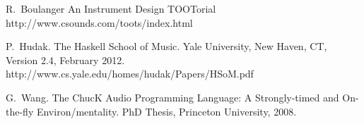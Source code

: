 \documentclass{sigplanconf-pldi15}
\begin{document}


\begin{thebibliography}{}
\softraggedright

\bibitem[Boulanger]
R.~Boulanger
\newblock An Instrument Design TOOTorial
\newblock http://www.csounds.com/toots/index.html

P.~Hudak.
\newblock The Haskell School of Music.
\newblock Yale University, New Haven, CT, Version 2.4, February 2012.
\newblock http://www.cs.yale.edu/homes/hudak/Papers/HSoM.pdf

G.~Wang.
\newblock The ChucK Audio Programming Language: A Strongly-timed and On-the-fly Environ/mentality.
\newblock PhD Thesis, Princeton University, 2008.



\end{thebibliography}
\end{document}
